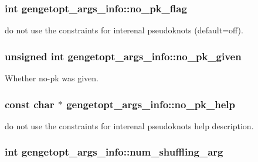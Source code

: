 \hypertarget{structgengetopt__args__info_a656b35ad9dd3f8f39444ec2684fcf47c}{
\subsubsection[{no\+\_\+pk\+\_\+flag}]{\setlength{\rightskip}{0pt plus 5cm}int gengetopt\+\_\+args\+\_\+info\+::no\+\_\+pk\+\_\+flag}}\label{structgengetopt__args__info_a656b35ad9dd3f8f39444ec2684fcf47c}


do not use the constraints for interenal pseudoknots (default=off). 

\hypertarget{structgengetopt__args__info_a6aa44a52828faad6c6d8ec6b4ab5494e}{
\subsubsection[{no\+\_\+pk\+\_\+given}]{\setlength{\rightskip}{0pt plus 5cm}unsigned int gengetopt\+\_\+args\+\_\+info\+::no\+\_\+pk\+\_\+given}}\label{structgengetopt__args__info_a6aa44a52828faad6c6d8ec6b4ab5494e}


Whether no-\/pk was given. 

\hypertarget{structgengetopt__args__info_ab2409525071e5bcc073637b7e252fea8}{
\subsubsection[{no\+\_\+pk\+\_\+help}]{\setlength{\rightskip}{0pt plus 5cm}const char $\ast$ gengetopt\+\_\+args\+\_\+info\+::no\+\_\+pk\+\_\+help}}\label{structgengetopt__args__info_ab2409525071e5bcc073637b7e252fea8}


do not use the constraints for interenal pseudoknots help description. 

\hypertarget{structgengetopt__args__info_a715feb4a7b63112c0029aca5bc3e0e15}{
\subsubsection[{num\+\_\+shuffling\+\_\+arg}]{\setlength{\rightskip}{0pt plus 5cm}int gengetopt\+\_\+args\+\_\+info\+::num\+\_\+shuffling\+\_\+arg}}\label{structgengetopt__args__info_a715feb4a7b63112c0029aca5bc3e0e15}



